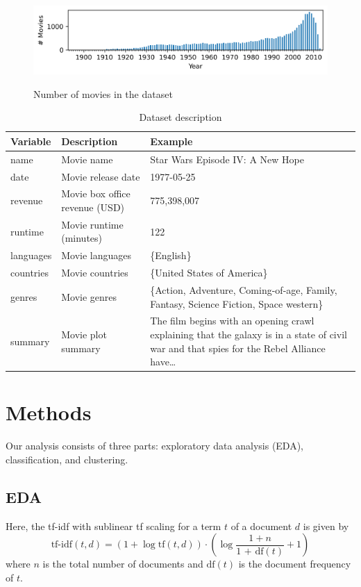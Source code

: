 \documentclass[hidelinks]{article}
\begin{document}
\begin{multicols}{2}
\begin{figure}
\caption{Number of movies in the dataset}
\centering
\includegraphics[width=5in]{figures/number_movies_per_year_bar_chart.png}
\label{figure:number_movies_per_year_bar_chart}
\end{figure}

\begin{table}
\caption{Dataset description}
\centering
\begin{tabularx}{.9\textwidth}{llX}
    \textbf{Variable} & \textbf{Description} & \textbf{Example} \\
    \hline
    name & Movie name & Star Wars Episode IV: A New Hope \\
    date & Movie release date & 1977-05-25 \\
    revenue & Movie box office revenue (USD) & 775,398,007 \\
    runtime & Movie runtime (minutes) & 122 \\
    languages & Movie languages & \{English\} \\
    countries & Movie countries & \{United States of America\} \\
    genres & Movie genres & \{Action, Adventure, Coming-of-age, Family, Fantasy, Science Fiction, Space western\} \\
    summary & Movie plot summary & The film begins with an opening crawl explaining that the galaxy is in a state of civil war and that spies for the Rebel Alliance have\ldots \\
\end{tabularx}
\label{table:dataset}
\end{table}

\section{Methods}
Our analysis consists of three parts: exploratory data analysis (EDA), classification, and clustering.
\subsection{EDA}
Here, the tf-idf with sublinear tf scaling for a term $t$ of a document $d$ is given by
$$\text{tf-idf}(t, d) = (1 + \log\text{tf}(t, d)) \cdot \left(\log\frac{1 + n}{\text{1 + df}(t)} + 1\right)$$
where $n$ is the total number of documents and $\text{df}(t)$ is the document frequency of $t$.

\end{multicols}
\end{document}
